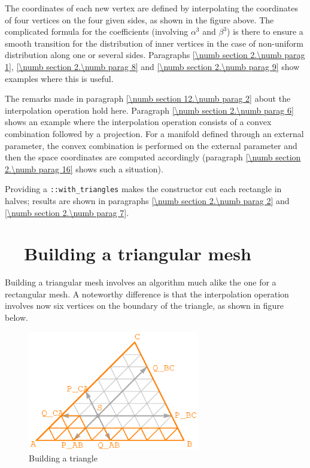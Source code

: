 The coordinates of each new vertex are defined by interpolating the coordinates of four vertices
on the four given sides, as shown in the figure above.
The complicated formula for the coefficients (involving $ \alpha^3 $ and $ \beta^3 $) is there
to ensure a smooth transition for the distribution of inner vertices in the case of non-uniform
distribution along one or several sides.
Paragraphs \ref{\numb section 2.\numb parag 1}, \ref{\numb section 2.\numb parag 8} and
\ref{\numb section 2.\numb parag 9} show examples where this is useful.

The remarks made in paragraph \ref{\numb section 12.\numb parag 2} about
the interpolation operation hold here.
Paragraph \ref{\numb section 2.\numb parag 6} shows an example where the interpolation operation
consists of a convex combination followed by a projection.
For a manifold defined through an external parameter, the convex combination is performed
on the external parameter and then the space coordinates are computed accordingly
(paragraph \ref{\numb section 2.\numb parag 16} shows such a situation).

Providing a {\small\tt {}::with\_triangles} makes the constructor cut each rectangle
in halves; results are shown in paragraphs \ref{\numb section 2.\numb parag 2} and
\ref{\numb section 2.\numb parag 7}.


\section{~~Building a triangular mesh}\label{\numb section 12.\numb parag 4}

Building a triangular mesh involves an algorithm much alike the one for a rectangular mesh.
A noteworthy difference is that the interpolation operation involves now six vertices on
the boundary of the triangle, as shown in figure below.

\begin{figure}[ht] \centering
  \includegraphics[width=75mm]{fig-triangle}
  \caption{Building a triangle}
  \label{\numb section 12.\numb fig 2}
\end{figure}


